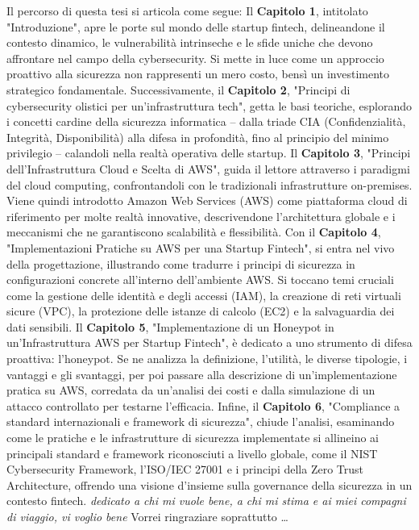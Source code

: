 \documentclass[a4paper,12pt]{report}
\begin{document}
        Il percorso di questa tesi si articola come segue:
        Il \textbf{Capitolo 1}, intitolato "Introduzione", apre le porte sul mondo delle startup fintech, delineandone il contesto dinamico, le vulnerabilità intrinseche e le sfide uniche che devono affrontare nel campo della cybersecurity. Si mette in luce come un approccio proattivo alla sicurezza non rappresenti un mero costo, bensì un investimento strategico fondamentale.
        Successivamente, il \textbf{Capitolo 2}, "Principi di cybersecurity olistici per un'infrastruttura tech", getta le basi teoriche, esplorando i concetti cardine della sicurezza informatica – dalla triade CIA (Confidenzialità, Integrità, Disponibilità) alla difesa in profondità, fino al principio del minimo privilegio – calandoli nella realtà operativa delle startup.
        Il \textbf{Capitolo 3}, "Principi dell'Infrastruttura Cloud e Scelta di AWS", guida il lettore attraverso i paradigmi del cloud computing, confrontandoli con le tradizionali infrastrutture on-premises. Viene quindi introdotto Amazon Web Services (AWS) come piattaforma cloud di riferimento per molte realtà innovative, descrivendone l'architettura globale e i meccanismi che ne garantiscono scalabilità e flessibilità.
        Con il \textbf{Capitolo 4}, "Implementazioni Pratiche su AWS per una Startup Fintech", si entra nel vivo della progettazione, illustrando come tradurre i principi di sicurezza in configurazioni concrete all'interno dell'ambiente AWS. Si toccano temi cruciali come la gestione delle identità e degli accessi (IAM), la creazione di reti virtuali sicure (VPC), la protezione delle istanze di calcolo (EC2) e la salvaguardia dei dati sensibili.
        Il \textbf{Capitolo 5}, "Implementazione di un Honeypot in un'Infrastruttura AWS per Startup Fintech", è dedicato a uno strumento di difesa proattiva: l'honeypot. Se ne analizza la definizione, l'utilità, le diverse tipologie, i vantaggi e gli svantaggi, per poi passare alla descrizione di un'implementazione pratica su AWS, corredata da un'analisi dei costi e dalla simulazione di un attacco controllato per testarne l'efficacia.
        Infine, il \textbf{Capitolo 6}, "Compliance a standard internazionali e framework di sicurezza", chiude l'analisi, esaminando come le pratiche e le infrastrutture di sicurezza implementate si allineino ai principali standard e framework riconosciuti a livello globale, come il NIST Cybersecurity Framework, l'ISO/IEC 27001 e i principi della Zero Trust Architecture, offrendo una visione d'insieme sulla governance della sicurezza in un contesto fintech.
{\hfill \Large {\sl dedicato a chi mi vuole bene, a chi mi stima e ai miei compagni di viaggio, vi voglio bene}}
        Vorrei ringraziare soprattutto \dots
\afterpreface
\tableofcontents
\listoffigures %
\end{document}
